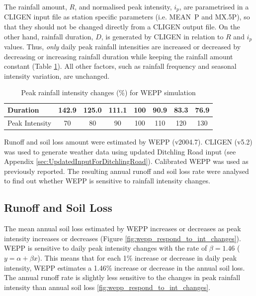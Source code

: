The rainfall amount, $R$, and normalised peak intensity, $i_p$, are parametrised
in a CLIGEN input file as station specific parameters (i.e. MEAN~P and {MX.5P}),
so that they should not be changed directly from a CLIGEN output file. On the
other hand, rainfall duration, $D$, is generated by CLIGEN in relation to $R$
and $i_p$ values. Thus, \textit{only} daily peak rainfall intensities are
increased or decreased by decreasing or increasing rainfall duration while
keeping the rainfall amount constant (Table
\ref{tab:PeakRainfallIntensityChangesForWEPPSimulation}). All other factors,
such as rainfall frequency and seasonal intensity variation, are unchanged.

\begin{table}[htbp]
  \centering
  \caption[Peak rainfall intensity changes for WEPP simulation]{Peak
rainfall intensity changes (\%) for WEPP simulation}
  \label{tab:PeakRainfallIntensityChangesForWEPPSimulation}
    \begin{tabular}{lccccccc}
    \toprule
    Duration & 142.9 & 125.0 & 111.1 & 100 & 90.9 & 83.3 & 76.9\\
    \midrule
    Peak Intensity & 70 & 80 & 90 & 100 & 110 & 120 & 130\\
    \bottomrule
    \end{tabular}
\end{table}

Runoff and soil loss amount were estimated by WEPP (v2004.7). CLIGEN (v5.2) was
used to generate weather data using updated Ditchling Road input (see Appendix
\ref{sec:UpdatedInputForDitchlingRoad}). Calibrated WEPP was used as previously
reported. The resulting annual runoff and soil loss rate were analysed to find
out whether WEPP is sensitive to rainfall intensity changes.

\subsection{Runoff and Soil Loss}
\label{sec:SensitivityOfWEPPToRainfallIntensityChangesResults}
The mean annual soil loss estimated by WEPP increases or decreases as peak
intensity increases or decreases (Figure
\ref{fig:wepp_respond_to_int_changes}). WEPP is sensitive to daily peak
intensity changes with the rate of $\beta = 1.46$ ($y = \alpha + \beta x$).
This means that for each 1\% increase or decrease in daily peak intensity,
WEPP estimates a 1.46\% increase or decrease in the annual soil loss. The
annual runoff rate is slightly less sensitive to the changes in peak
rainfall intensity than annual soil loss
\ref{fig:wepp_respond_to_int_changes}.

